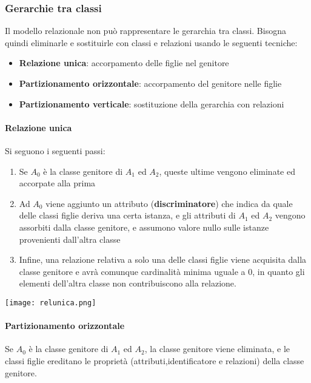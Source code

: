 \subsubsection{Gerarchie tra classi}
Il modello relazionale non può rappresentare le gerarchia tra classi. Bisogna quindi eliminarle e sostituirle con classi e relazioni usando le seguenti tecniche:
\begin{itemize}
	\item \textbf{Relazione unica}: accorpamento delle figlie nel genitore
	\item \textbf{Partizionamento orizzontale}: accorpamento del genitore nelle figlie
	\item \textbf{Partizionamento verticale}: sostituzione della gerarchia con relazioni
\end{itemize}

\paragraph{Relazione unica}
Si seguono i seguenti passi:
\begin{enumerate}
	\item Se $A_0$ è la classe genitore di $A_1$ ed $A_2$, queste ultime vengono eliminate ed accorpate alla prima
	\item Ad $A_0$ viene aggiunto un attributo (\textbf{discriminatore}) che indica da quale delle classi figlie deriva una certa istanza, e gli attributi di $A_1$ ed $A_2$ vengono assorbiti dalla classe genitore, e assumono valore nullo sulle istanze provenienti dall’altra classe
	\item Infine, una relazione relativa a solo una delle classi figlie viene acquisita dalla classe genitore e avrà comunque cardinalità minima uguale a $0$, in quanto gli elementi dell’altra classe non contribuiscono alla relazione.
\end{enumerate}

\begin{center}
	\texttt{[image: relunica.png]}
\end{center}

\newpage
\paragraph{Partizionamento orizzontale}
Se $A_0$ è la classe genitore di $A_1$ ed $A_2$, la classe genitore viene eliminata, e le classi figlie ereditano le proprietà (attributi,identificatore e relazioni) della classe genitore.

